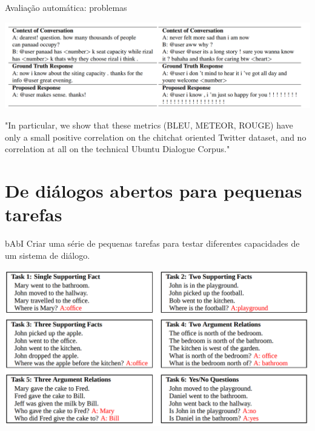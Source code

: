 \documentclass[10pt]{beamer}
\begin{document}
\begin{frame}{Avaliação automática: problemas}
\begin{center}
\includegraphics[scale=0.23]{images/weak_corr.png}
\end{center}

"In particular, we show that these metrics (BLEU, METEOR, ROUGE) have only a small positive correlation on the chitchat oriented Twitter dataset, and no correlation at all on the technical Ubuntu Dialogue Corpus." \cite{LiuLSNCP16}

\end{frame}

\section{De diálogos abertos para pequenas tarefas}

\begin{frame}{bAbI \cite{WestonBCM15}}
Criar uma série de pequenas tarefas para testar diferentes capacidades de um sistema de diálogo.


\begin{center}
\includegraphics[scale=0.25]{images/babi.png}
\end{center}
\end{frame}
\end{document}
